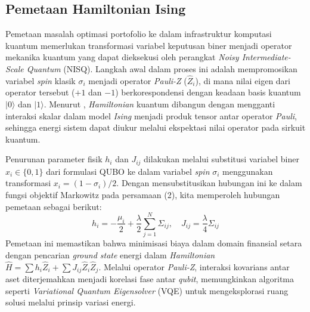 \subsection{Pemetaan Hamiltonian Ising}

Pemetaan masalah optimasi portofolio ke dalam infrastruktur komputasi kuantum memerlukan transformasi variabel keputusan biner menjadi operator mekanika kuantum yang dapat dieksekusi oleh perangkat \textit{Noisy Intermediate-Scale Quantum} (NISQ). Langkah awal dalam proses ini adalah mempromosikan variabel \textit{spin} klasik $\sigma_i$ menjadi operator \textit{Pauli-Z} ($\hat{Z}_i$), di mana nilai eigen dari operator tersebut ($+1$ dan $-1$) berkorespondensi dengan keadaan basis kuantum $|0\rangle$ dan $|1\rangle$. Menurut \cite{lucas_ising_2014}, \textit{Hamiltonian} kuantum dibangun dengan mengganti interaksi skalar dalam model \textit{Ising} menjadi produk tensor antar operator \textit{Pauli}, sehingga energi sistem dapat diukur melalui ekspektasi nilai operator pada sirkuit kuantum.

Penurunan parameter fisik $h_i$ dan $J_{ij}$ dilakukan melalui substitusi variabel biner $x_i \in \{0, 1\}$ dari formulasi QUBO ke dalam variabel \textit{spin} $\sigma_i$ menggunakan transformasi $x_i = (1 - \sigma_i)/2$. Dengan mensubstitusikan hubungan ini ke dalam fungsi objektif Markowitz pada persamaan (2), kita memperoleh hubungan pemetaan sebagai berikut:
\begin{equation}
    h_i = -\frac{\mu_i}{2} + \frac{\lambda}{2} \sum_{j=1}^{N} \Sigma_{ij}, \quad J_{ij} = \frac{\lambda}{4} \Sigma_{ij}
\end{equation}
Pemetaan ini memastikan bahwa minimisasi biaya dalam domain finansial setara dengan pencarian \textit{ground state} energi dalam \textit{Hamiltonian} $\hat{H} = \sum h_i \hat{Z}_i + \sum J_{ij} \hat{Z}_i \hat{Z}_j$. Melalui operator \textit{Pauli-Z}, interaksi kovarians antar aset diterjemahkan menjadi korelasi fase antar \textit{qubit}, memungkinkan algoritma seperti \textit{Variational Quantum Eigensolver} (VQE) untuk mengeksplorasi ruang solusi melalui prinsip variasi energi.

